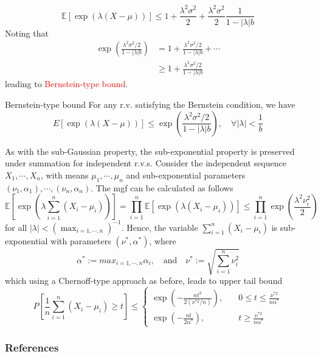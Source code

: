 \documentclass[10pt,handout,english]{beamer}
\newcommand{\E}{\mathbb{E}}
\newcommand{\1}{\mathbbm{1}}
\begin{document}
\begin{frame}[allowframebreaks]
\[
\E[\exp(\lambda(X-\mu))]\leq 1+\frac{\lambda^2\sigma^2}{2}+\frac{\lambda^2\sigma^2}{2}\frac{1}{1-\lvert\lambda\rvert b}
\]
Noting that 
\begin{align*}
\exp\left(\frac{\lambda^2\sigma^2/2}{1-\lvert\lambda\rvert b}\right)&=1+\frac{\lambda^2\sigma^2/2}{1-\lvert\lambda\rvert b}+\cdots\\
&\geq 1+\frac{\lambda^2\sigma^2/2}{1-\lvert\lambda\rvert b}
\end{align*}
leading to \textcolor{red}{Bernstein-type bound}.
\begin{block}{Bernstein-type bound}
For any r.v. satisfying the Bernstein condition, we have
\[
E[\exp(\lambda(X-\mu))]\leq \exp\left(\frac{\lambda^2\sigma^2/2}{1-\lvert\lambda\rvert b}\right),\quad \forall\lvert\lambda\rvert<\frac{1}{b}
\]
\end{block}

As with the sub-Gaussian property, the sub-exponential property is preserved under summation for independent r.v.s. Consider the independent sequence $X_1,\cdots,X_n$, with means $\mu_1,\cdots,\mu_n$ and sub-exponential parameters $(\nu_1,\alpha_1),\cdots,(\nu_n,\alpha_n)$. The mgf can be calculated as follows
\[
\E\left[\exp\left(\lambda\sum_{i=1}^n(X_i-\mu_i)\right)\right]=\prod\limits_{i=1}^n\E[\exp(\lambda(X_i-\mu_i))]\leq \prod\limits_{i=1}^n\exp\left(\frac{\lambda^2\nu_i^2}{2}\right)
\]
for all $\lvert\lambda\rvert<(\max_{i=1,\cdots,n})^{-1}$. Hence, the variable $\sum_{i=1}^n(X_i-\mu_i)$ is sub-exponential with parameters $(\nu^*,\alpha^*)$, where 
\[
\alpha^*:=max_{i=1,\cdots,n}\alpha_i,\quad\text{and}\quad\nu^*:=\sqrt{\sum\limits_{i=1}^{n}\nu_i^2}
\]
which  using a Chernoff-type approach as before, leads to upper tail bound
\[
P\left[\frac{1}{n}\sum\limits_{i=1}^{n}(X_i-\mu_i)\geq t\right]\leq
\begin{cases}
\exp\left(-\frac{nt^2}{2(\nu^{*2}/n)}\right),\quad &0\leq t\leq \frac{\nu^{*2}}{n\alpha^*}\\
\exp\left(-\frac{nt}{2\alpha^{*}}\right),\quad &t\geq \frac{\nu^{*2}}{n\alpha^*}
\end{cases}
\]
\end{frame}

\begin{frame}[allowframebreaks]
\frametitle{References}


\end{frame}
\end{document}

